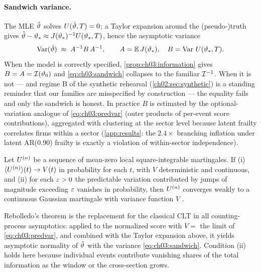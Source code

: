 \paragraph{Sandwich variance.}
The MLE $\hat{\vartheta}$ solves $U(\hat{\vartheta},T)=0$; a Taylor
expansion around the (pseudo-)truth gives $\hat{\vartheta} - \vartheta_*
\approx J(\vartheta_*)^{-1}U(\vartheta_*,T)$, hence the
asymptotic variance
\begin{equation}\label{eq:ch03:sandwich}
\operatorname{Var}(\hat{\vartheta}) \;\approx\; A^{-1} B\, A^{-1},
\qquad
A = \mathbb{E}\,J(\vartheta_*),
\quad
B = \operatorname{Var}\,U(\vartheta_*,T).
\end{equation}
When the model is correctly specified, \cref{prop:ch03:information} gives
$B = A = \mathcal{I}(\vartheta_0)$ and \cref{eq:ch03:sandwich} collapses to
the familiar $\mathcal{I}^{-1}$. When it is not --- and regime B of the
synthetic rehearsal (\cref{ch02:sec:synthetic}) is a standing reminder
that our families are misspecified by construction --- the equality fails
and only the sandwich is honest. In practice $B$ is estimated by the
optional-variation analogue of \cref{eq:ch03:predvar} (outer products of
per-event score contributions), aggregated with clustering at the sector
level because latent frailty correlates firms within a sector
(\cref{app:results}: the $2.4\times$ branching inflation under latent
AR(0.90) frailty is exactly a violation of within-sector independence).

\begin{theorem}\label{thm:ch03:rebolledo}
Let $U^{(n)}$ be a sequence of mean-zero local square-integrable
martingales. If (i) $\langle U^{(n)}\rangle(t) \to V(t)$ in
probability for each $t$, with $V$ deterministic and continuous, and (ii)
for each $\varepsilon>0$ the predictable variation contributed by jumps of
magnitude exceeding $\varepsilon$ vanishes in probability, then
$U^{(n)}$ converges weakly to a continuous Gaussian martingale with
variance function $V$ \citep{abgk1993,andersengill1982}.
\end{theorem}

Rebolledo's theorem is the replacement for the classical CLT in all
counting-process asymptotics: applied to the normalized score with
$V = $ the limit of \cref{eq:ch03:predvar}, and combined with the Taylor
expansion above, it yields asymptotic normality of $\hat{\vartheta}$ with the
variance \cref{eq:ch03:sandwich}. Condition (ii) holds here because
individual events contribute vanishing shares of the total information as
the window or the cross-section grows.


